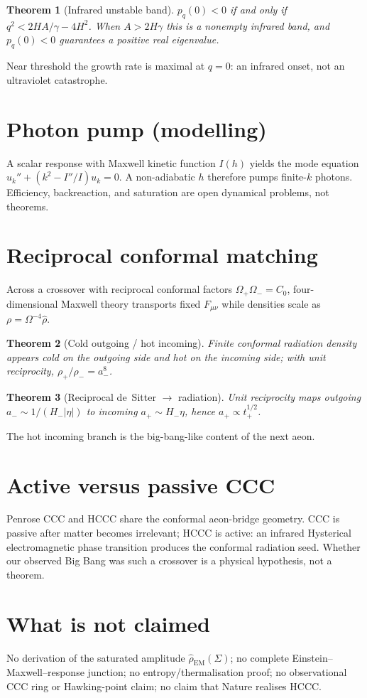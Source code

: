 \documentclass[11pt]{article}
\newtheorem{theorem}{Theorem}[section]
\theoremstyle{definition}
\theoremstyle{remark}
\begin{document}
\begin{theorem}[Infrared unstable band]
$p_q(0)<0$ if and only if $q^2<2HA/\gamma-4H^2$.
When $A>2H\gamma$ this is a nonempty infrared band, and $p_q(0)<0$ guarantees a positive
real eigenvalue.
\end{theorem}

Near threshold the growth rate is maximal at $q=0$: an infrared onset, not an ultraviolet
catastrophe.

\section{Photon pump (modelling)}
A scalar response with Maxwell kinetic function $I(h)$ yields the mode equation
$u_k''+(k^2-I''/I)u_k=0$.
A non-adiabatic $h$ therefore pumps finite-$k$ photons.
Efficiency, backreaction, and saturation are open dynamical problems, not theorems.

\section{Reciprocal conformal matching}
Across a crossover with reciprocal conformal factors $\Omega_+\Omega_-=C_0$, four-dimensional
Maxwell theory transports fixed $F_{\mu\nu}$ while densities scale as $\rho=\Omega^{-4}\hat\rho$.

\begin{theorem}[Cold outgoing / hot incoming]
Finite conformal radiation density appears cold on the outgoing side and hot on the
incoming side; with unit reciprocity, $\rho_+/\rho_-=a_-^{8}$.
\end{theorem}

\begin{theorem}[Reciprocal de~Sitter $\to$ radiation]
Unit reciprocity maps outgoing $a_-\sim 1/(H_-|\eta|)$ to incoming $a_+\sim H_-\eta$, hence
$a_+\propto t_+^{1/2}$.
\end{theorem}

The hot incoming branch is the big-bang-like content of the next aeon.

\section{Active versus passive CCC}
Penrose CCC and HCCC share the conformal aeon-bridge geometry.
CCC is passive after matter becomes irrelevant; HCCC is active: an infrared Hysterical
electromagnetic phase transition produces the conformal radiation seed.
Whether our observed Big Bang was such a crossover is a physical hypothesis, not a theorem.

\section{What is not claimed}
No derivation of the saturated amplitude $\hat\rho_{\mathrm{EM}}(\Sigma)$; no complete
Einstein--Maxwell--response junction; no entropy/thermalisation proof; no observational CCC
ring or Hawking-point claim; no claim that Nature realises HCCC.
\end{document}
